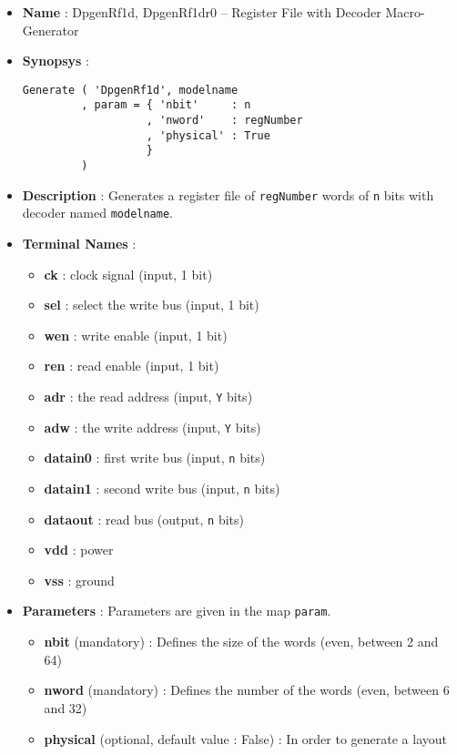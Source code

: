 \begin{itemize}
    \item \textbf{Name} : DpgenRf1d, DpgenRf1dr0 -- Register File with Decoder Macro-Generator
    \item \textbf{Synopsys} :
\begin{verbatim}
Generate ( 'DpgenRf1d', modelname
         , param = { 'nbit'     : n
                   , 'nword'    : regNumber
                   , 'physical' : True                   
                   }
         )
\end{verbatim}
    \item \textbf{Description} : Generates a register file of \verb-regNumber- words of \verb-n- bits with decoder named \verb-modelname-.
    \item \textbf{Terminal Names} :
    \begin{itemize}
        \item \textbf{ck} : clock signal (input, 1 bit)
        \item \textbf{sel} : select the write bus (input, 1 bit)
        \item \textbf{wen} : write enable (input, 1 bit)
        \item \textbf{ren} : read enable (input, 1 bit)
        \item \textbf{adr} : the read address (input, \verb-Y- bits)
        \item \textbf{adw} : the write address (input, \verb-Y- bits)
        \item \textbf{datain0} : first write bus (input, \verb-n- bits)
        \item \textbf{datain1} : second write bus (input, \verb-n- bits)
        \item \textbf{dataout} : read bus (output, \verb-n- bits)
        \item \textbf{vdd} : power
        \item \textbf{vss} : ground
    \end{itemize}
    \item \textbf{Parameters} : Parameters are given in the map \verb-param-.
    \begin{itemize}
        \item \textbf{nbit} (mandatory) : Defines the size of the words  (even, between 2 and 64)
        \item \textbf{nword} (mandatory) : Defines the number of the words (even, between 6 and 32)
        \item \textbf{physical} (optional, default value : False) : In order to generate a layout    

\end{itemize}
\end{itemize}
